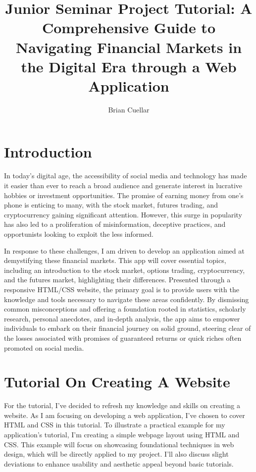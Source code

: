 \documentclass[10pt,twocolumn]{article}
\title{Junior Seminar Project Tutorial: A Comprehensive Guide to Navigating Financial Markets in the Digital Era through a Web Application}
\author{Brian Cuellar}
\affiliation{Occidental College}
\begin{document}
\maketitle

\section{Introduction}

In today's digital age, the accessibility of social media and technology has made it easier than ever to reach a broad audience and generate interest in lucrative hobbies or investment opportunities. The promise of earning money from one's phone is enticing to many, with the stock market, futures trading, and cryptocurrency gaining significant attention. However, this surge in popularity has also led to a proliferation of misinformation, deceptive practices, and opportunists looking to exploit the less informed.

In response to these challenges, I am driven to develop an application aimed at demystifying these financial markets. This app will cover essential topics, including an introduction to the stock market, options trading, cryptocurrency, and the futures market, highlighting their differences. Presented through a responsive HTML/CSS website, the primary goal is to provide users with the knowledge and tools necessary to navigate these areas confidently. By dismissing common misconceptions and offering a foundation rooted in statistics, scholarly research, personal anecdotes, and in-depth analysis, the app aims to empower individuals to embark on their financial journey on solid ground, steering clear of the losses associated with promises of guaranteed returns or quick riches often promoted on social media.

\section{Tutorial On Creating A Website}

For the tutorial, I've decided to refresh my knowledge and skills on creating a website. As I am focusing on developing a web application, I've chosen to cover HTML and CSS in this tutorial. To illustrate a practical example for my application's tutorial, I'm creating a simple webpage layout using HTML and CSS. This example will focus on showcasing foundational techniques in web design, which will be directly applied to my project. I'll also discuss slight deviations to enhance usability and aesthetic appeal beyond basic tutorials.
\end{document}
